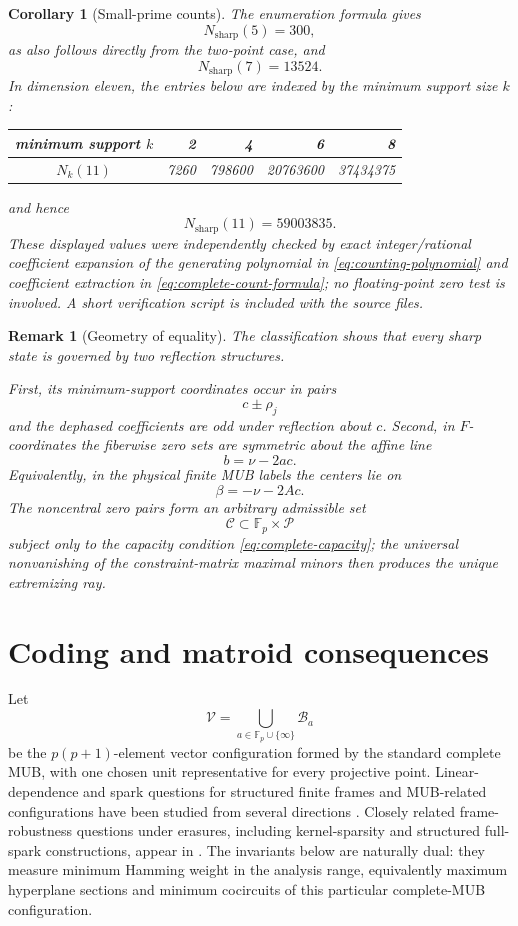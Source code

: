 \documentclass[11pt]{article}
\newtheorem{corollary}[theorem]{Corollary}
\newtheorem{remark}[theorem]{Remark}
\newcommand{\F}{\mathbb F}
\begin{document}
\begin{corollary}[Small-prime counts]
\label{cor:small-prime-sharp-counts}
The enumeration formula gives
\[
 N_{\mathrm{sharp}}(5)=300,
\]
as also follows directly from the two-point case, and
\[
 N_{\mathrm{sharp}}(7)=13524.
\]
In dimension eleven, the entries below are indexed by the minimum support
size \(k\):
\begin{center}
\begin{tabular}{c@{\qquad}rrrr}
\toprule
minimum support \(k\) & 2 & 4 & 6 & 8 \\
\midrule
\(N_k(11)\) & 7260 & 798600 & 20763600 & 37434375 \\
\bottomrule
\end{tabular}
\end{center}
and hence
\[
 \boxed{
 N_{\mathrm{sharp}}(11)=59003835.
 }
\]
These displayed values were independently checked by exact integer/rational
coefficient expansion of the generating polynomial in
\eqref{eq:counting-polynomial} and coefficient extraction in
\eqref{eq:complete-count-formula}; no floating-point zero test is involved.
A short verification script is included with the source files.
\end{corollary}

\begin{remark}[Geometry of equality]
\label{rem:complete-equality-geometry}
The classification shows that every sharp state is governed by two
reflection structures.

First, its minimum-support coordinates occur in pairs
\[
 c\pm\rho_j
\]
and the dephased coefficients are odd under reflection about \(c\).
Second, in \(F\)-coordinates the fiberwise zero sets are symmetric about
the affine line
\[
 b=\nu-2ac.
\]
Equivalently, in the physical finite MUB labels the centers lie on
\[
 \beta=-\nu-2Ac.
\]
The noncentral zero pairs form an arbitrary admissible set
\[
 \mathcal C\subset\F_p\times\mathcal P
\]
subject only to the capacity condition
\eqref{eq:complete-capacity}; the universal nonvanishing of the
constraint-matrix maximal minors then produces the unique extremizing
ray.
\end{remark}


\section{Coding and matroid consequences}
\label{sec:code-matroid}

Let
\[
 \mathcal V
 =
 \bigcup_{a\in\F_p\cup\{\infty\}}\mathcal B_a
\]
be the \(p(p+1)\)-element vector configuration formed by the standard
complete MUB, with one chosen unit representative for every projective
point.  Linear-dependence and spark questions for structured finite frames
and MUB-related configurations have been studied from several directions
\cite{CasazzaKutyniok,BodmannPaulsen,AlexeevCahillMixon,Blanchfield,
JafarpourDuarteCalderbank}.  Closely related frame-robustness questions under
erasures, including kernel-sparsity and structured full-spark constructions,
appear in \cite{LiFrameErasures,LiTNS2026}.  The invariants below are naturally
dual: they measure minimum Hamming weight in
the analysis range, equivalently maximum hyperplane sections and minimum
cocircuits of this particular complete-MUB configuration.
\end{document}
